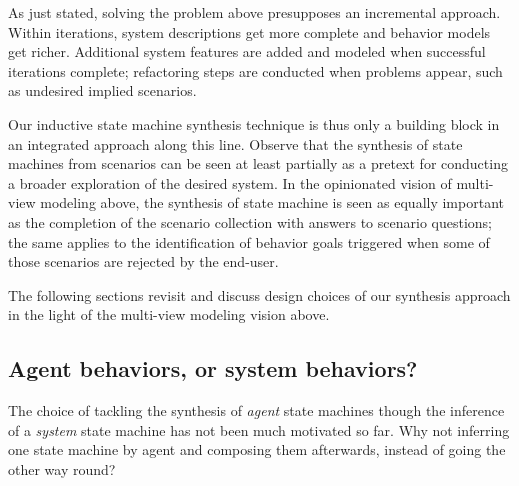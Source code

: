 As just stated, solving the problem above presupposes an incremental approach. Within iterations, system descriptions get more complete and behavior models get richer. Additional system features are added and modeled when successful iterations complete; refactoring steps are conducted when problems appear, such as undesired implied scenarios.

Our inductive state machine synthesis technique is thus only a building block in an integrated approach along this line. Observe that the synthesis of state machines from scenarios can be seen at least partially as a pretext for conducting a broader exploration of the desired system. In the opinionated vision of multi-view modeling above, the synthesis of state machine is seen as equally important as the completion of the scenario collection with answers to scenario questions; the same applies to the identification of behavior goals triggered when some of those scenarios are rejected by the end-user.

The following sections revisit and discuss design choices of our synthesis approach in the light of the multi-view modeling vision above.

\subsection{Agent behaviors, or system behaviors?}

The choice of tackling the synthesis of \emph{agent} state machines though the inference of a \emph{system} state machine has not been much motivated so far. Why not inferring one state machine by agent and composing them afterwards, instead of going the other way round?

